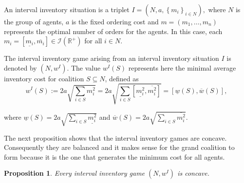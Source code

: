 \documentclass[12pt]{article}
\newtheorem{prop}{\sc Proposition}[section]
\begin{document}
\noindent An interval inventory situation is a triplet $I=\left( N,a,\left\{
m_{i}\right\} _{i\in N}\right) ,$ where $N$ is the
group of agents, $a$ is the fixed ordering cost and $m=(m_{1},\ldots ,m_{n})$ represents the optimal number of orders for the agents. In this case, each $m_{i}=\left[ \underline{m_{i}},
\overline{m_{i}}\right] \in \mathcal{I}(\mathbb{R}^+)$ for all $i\in N.$

\noindent The interval inventory game arising from an interval inventory
situation $I$ is denoted by $\left( N,w^I\right) $. The value $w^I(S)$ represents here the minimal average
inventory cost for coalition $S\subseteq N$, defined as  
\begin{equation*}
w^I(S):=2a\sqrt{\sum_{i\in S}m_{i}^{2}}=2a\sqrt{\sum_{i\in S}\left[ 
\underline{m_{i}^{2}},\overline{m_{i}^{2}}\right] }=\left[ \underline{w}(S),%
\overline{w}(S)\right],
\end{equation*}

where $\underline{w}(S)=2a\sqrt{\sum_{i\in S}\underline{m_{i}^{2}}}$ and $\overline{w}(S)=2a\sqrt{\sum_{i\in S}\overline{m_{i}^{2}}}$.



The next proposition shows that the interval inventory games are concave. Consequently they are balanced and it makes sense for the grand coalition to form because it is the one that generates the minimum cost for all agents.

\begin{prop}
\noindent Every interval inventory game $\left(
N,w^I\right) $ is concave.
\end{prop}
\end{document}
